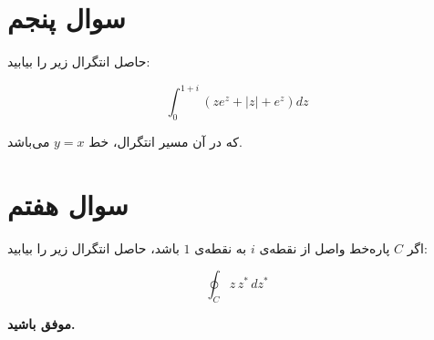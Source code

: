 \documentclass[a4paper,16pt]{article}
\begin{document}
	\section{سوال پنجم}
	
	حاصل انتگرال زیر را بیابید:
	
	\[
	\int_{0}^{1+i} {(ze^{z}+ |z|+e^{z})dz}
	\]
	
	که در آن مسیر انتگرال، خط \( y = x \) می‌باشد.
	\section{سوال هفتم}
	
	اگر \( C \) پاره‌خط واصل از نقطه‌ی \( i \) به نقطه‌ی \( 1 \) باشد،  
	حاصل انتگرال زیر را بیابید:
	
	\[
	\oint_{C} z \, z^{*} \, d z^{*}
	\]
	\vspace{10pt}
	
	\textbf{موفق باشید.}
	
\end{document}
